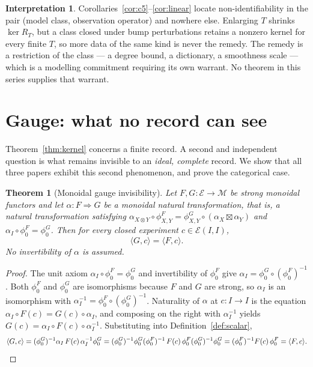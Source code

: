 \documentclass[11pt]{article}
\newtheorem{theorem}[definition]{Theorem}
\theoremstyle{definition}
\newtheorem{interpretation}[definition]{Interpretation}
\begin{document}
\begin{interpretation}
\label{int:kernel}
Corollaries~\ref{cor:c5}--\ref{cor:linear} locate non-identifiability in the
pair (model class, observation operator) and nowhere else. Enlarging $T$ shrinks
$\ker R_T$, but a class closed under bump perturbations retains a nonzero kernel
for every finite $T$, so more data of the same kind is never the remedy. The
remedy is a restriction of the class --- a degree bound, a dictionary, a
smoothness scale --- which is a modelling commitment requiring its own warrant.
No theorem in this series supplies that warrant.
\end{interpretation}

\section{Gauge: what no record can see}
\label{sec:gauge}

Theorem~\ref{thm:kernel} concerns a finite record. A second and independent
question is what remains invisible to an \emph{ideal, complete} record. We show
that all three papers exhibit this second phenomenon, and prove the categorical
case.

\begin{theorem}[Monoidal gauge invisibility]
\label{thm:gauge}
Let $F,G:\mathcal E\to\mathcal M$ be strong monoidal functors and let
$\alpha:F\Rightarrow G$ be a monoidal natural transformation, that is, a natural
transformation satisfying
$\alpha_{X\otimes Y}\circ\phi^F_{X,Y}=\phi^G_{X,Y}\circ(\alpha_X\boxtimes\alpha_Y)$
and $\alpha_I\circ\phi_0^F=\phi_0^G$. Then for every closed experiment
$c\in\mathcal E(I,I)$,
\[
\langle G,c\rangle=\langle F,c\rangle .
\]
No invertibility of $\alpha$ is assumed.
\end{theorem}
\begin{proof}
The unit axiom $\alpha_I\circ\phi_0^F=\phi_0^G$ and invertibility of
$\phi_0^F$ give $\alpha_I=\phi_0^G\circ(\phi_0^F)^{-1}$. Both $\phi_0^F$ and
$\phi_0^G$ are isomorphisms because $F$ and $G$ are strong, so $\alpha_I$ is an
isomorphism with $\alpha_I^{-1}=\phi_0^F\circ(\phi_0^G)^{-1}$. Naturality of
$\alpha$ at $c:I\to I$ is the equation
$\alpha_I\circ F(c)=G(c)\circ\alpha_I$, and composing on the right with
$\alpha_I^{-1}$ yields $G(c)=\alpha_I\circ F(c)\circ\alpha_I^{-1}$. Substituting
into Definition~\ref{def:scalar},
\[
\langle G,c\rangle
=(\phi_0^G)^{-1}\alpha_I\,F(c)\,\alpha_I^{-1}\phi_0^G
=(\phi_0^G)^{-1}\phi_0^G(\phi_0^F)^{-1}\,F(c)\,\phi_0^F(\phi_0^G)^{-1}\phi_0^G
=(\phi_0^F)^{-1}F(c)\,\phi_0^F
=\langle F,c\rangle. \qedhere
\]
\end{proof}
\end{document}

